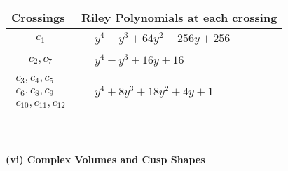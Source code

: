 \documentclass[1p]{elsarticle_modified}
\theoremstyle{definition}
\begin{document}
\begin{tabular}{m{50pt}|m{274pt}}
Crossings & \hspace{64pt}Riley Polynomials at each crossing \\
\hline $$\begin{aligned}c_{1}\end{aligned}$$&$\begin{aligned}
&y^4- y^3+64 y^2-256 y+256
\end{aligned}$\\
\hline $$\begin{aligned}c_{2},c_{7}\end{aligned}$$&$\begin{aligned}
&y^4- y^3+16 y+16
\end{aligned}$\\
\hline $$\begin{aligned}c_{3},c_{4},c_{5}\\c_{6},c_{8},c_{9}\\c_{10},c_{11},c_{12}\end{aligned}$$&$\begin{aligned}
&y^4+8 y^3+18 y^2+4 y+1
\end{aligned}$\\
\hline
\end{tabular}\\~\\
\newpage\flushleft \textbf{(vi) Complex Volumes and Cusp Shapes}
\end{document}
